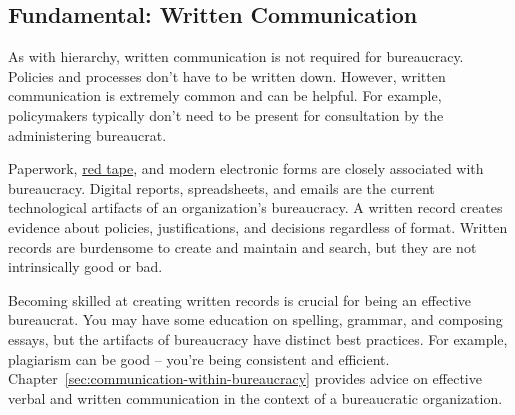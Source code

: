 \subsection*{Fundamental: Written Communication\label{sec:written-communication}}

As with hierarchy, written communication is not required for bureaucracy. Policies and processes don't have to be written down. However, written communication is extremely common and can be helpful. 
For example, policymakers typically don't need to be present for consultation by the administering bureaucrat.

Paperwork,  \href{https://en.wikipedia.org/wiki/Red_tape}{red tape},
and modern electronic forms are closely associated with bureaucracy.
Digital reports, spreadsheets, and emails are the current technological artifacts of an organization's bureaucracy. A written record creates evidence about policies, justifications, and decisions regardless of format. %
Written records are burdensome to create and maintain and search, but they are not intrinsically good or bad. 

Becoming skilled at creating written records is crucial for being an effective bureaucrat. You may have some education on spelling, grammar, and composing essays, but the artifacts of bureaucracy have distinct best practices. For example, plagiarism can be good -- you're being consistent and efficient.  
Chapter~\ref{sec:communication-within-bureaucracy} 
%
provides advice on effective verbal and written communication in the context of a bureaucratic organization. 